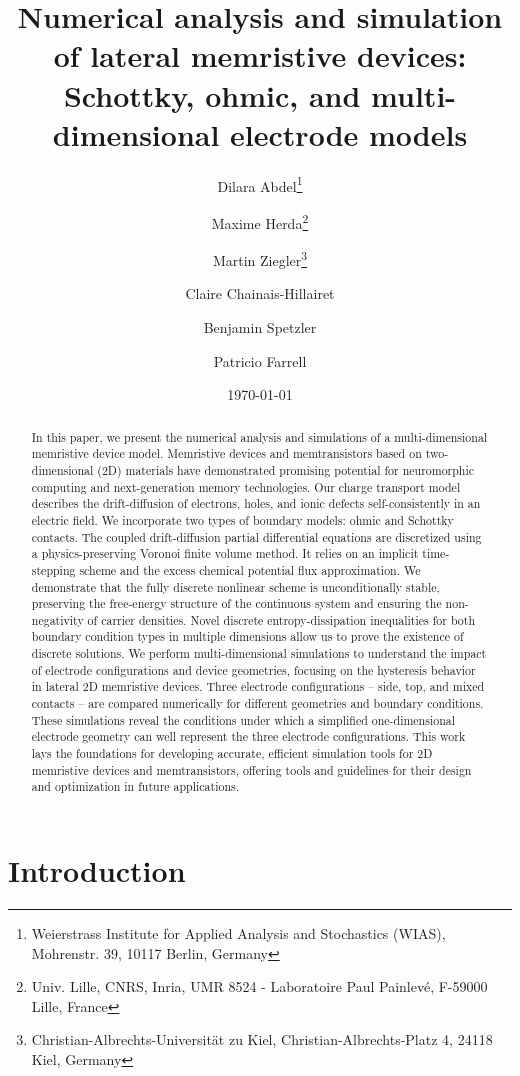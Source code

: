 \documentclass[10pt,a4paper, final]{article}
\title{Numerical analysis and simulation of lateral memristive devices: Schottky, ohmic, and multi-dimensional electrode models}
\author{
    Dilara Abdel\thanks{Weierstrass Institute for Applied Analysis and Stochastics (WIAS), Mohrenstr. 39, 10117 Berlin, Germany}
    \and Maxime Herda\thanks{Univ. Lille, CNRS, Inria, UMR 8524 - Laboratoire Paul Painlevé, F-59000 Lille, France}
    \and Martin Ziegler\thanks{Christian-Albrechts-Universität zu Kiel, Christian-Albrechts-Platz 4, 24118 Kiel, Germany}
    \and Claire Chainais-Hillairet\samethanks[2]
    \and Benjamin Spetzler\samethanks[3]
    \and Patricio Farrell\samethanks[1]
}
\date{\today}
\theoremstyle{definition}								%
\numberwithin{equation}{section}
\numberwithin{figure}{section}
\numberwithin{theorem}{section}
\begin{document}
    \maketitle
    \begin{abstract}
        In this paper, we present the numerical analysis and simulations of a multi-dimensional memristive device model.
        Memristive devices and memtransistors based on two-dimensional (2D) materials have demonstrated promising potential for neuromorphic computing and next-generation memory technologies.
        Our charge transport model describes the drift-diffusion of electrons, holes, and ionic defects self-consistently in an electric field. We incorporate two types of boundary models: ohmic and Schottky contacts. The coupled drift-diffusion partial differential equations are discretized using a physics-preserving Voronoi finite volume method. It relies on an implicit time-stepping scheme and the excess chemical potential flux approximation. We demonstrate that the fully discrete nonlinear scheme is unconditionally stable, preserving the free-energy structure of the continuous system and ensuring the non-negativity of carrier densities. Novel discrete entropy-dissipation inequalities for both boundary condition types in multiple dimensions allow us to prove the existence of discrete solutions. We perform multi-dimensional simulations to understand the impact of electrode configurations and device geometries, focusing on the hysteresis behavior in lateral 2D memristive devices. Three electrode configurations -- side, top, and mixed contacts -- are compared numerically for different geometries and boundary conditions. These simulations reveal the conditions under which a simplified one-dimensional electrode geometry can well represent the three electrode configurations. This work lays the foundations for developing accurate, efficient simulation tools for 2D memristive devices and memtransistors, offering tools and guidelines for their design and optimization in future applications.
    \end{abstract}



\section{Introduction}
\end{document}
